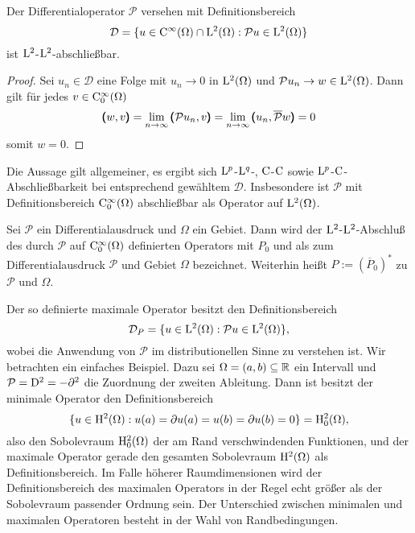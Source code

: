 \begin{lem}
Der Differentialoperator $\mathcal P$ versehen mit Definitionsbereich
\begin{equation}
  \mathcal D= \{ u\in\mathrm C^\infty(\Omega) \cap \mathrm L^2(\Omega) :  \mathcal Pu\in\mathrm L^2(\Omega) \}
\end{equation}
ist $\mathrm L^2$-$\mathrm L^2$-abschließbar.
\end{lem}
\begin{proof}
Sei $u_n\in\mathcal D$ eine Folge mit $u_n\to 0$ in $\mathrm L^2(\Omega)$ und $\mathcal Pu_n \to w\in\mathrm L^2(\Omega)$. Dann gilt f\"ur jedes 
$v\in\mathrm C^\infty_0(\Omega)$
\begin{equation}
 \pmb(w,v\pmb)=\lim_{n\to\infty}   \pmb(\mathcal Pu_n,v\pmb) = \lim_{n\to\infty} \pmb(u_n,\overline{\mathcal P}w\pmb) = 0
\end{equation}
somit $w=0$.
\end{proof}

Die Aussage gilt allgemeiner, es ergibt sich $\mathrm L^p$-$\mathrm L^q$-, $\mathrm C$-$\mathrm C$ sowie $\mathrm L^p$-$\mathrm C$-Abschließbarkeit bei entsprechend gewähltem $\mathcal D$. Insbesondere ist $\mathcal P$ mit Definitionsbereich $\mathrm C^\infty_0(\Omega)$ abschließbar als Operator auf $\mathrm L^2(\Omega)$. 

\begin{df} 
Sei $\mathcal P$ ein Differentialausdruck und $\Omega$ ein Gebiet. Dann wird der $\mathrm L^2$-$\mathrm L^2$-Abschluß des durch $\mathcal P$ auf $\mathrm C_0^\infty(\Omega)$ definierten Operators mit $P_0$ und als  zum Differentialausdruck $\mathcal P$ und Gebiet $\Omega$ bezeichnet. 
Weiterhin heißt $P := (\overline P_0)^*$  zu $\mathcal P$ und $\Omega$.
\end{df}

Der so definierte maximale Operator besitzt den Definitionsbereich
\begin{equation}
   \mathcal D_P = \{ u\in\mathrm L^2(\Omega) : \mathcal Pu \in\mathrm L^2(\Omega)\},
\end{equation}
wobei die Anwendung von $\mathcal P$ im distributionellen Sinne zu verstehen ist. Wir betrachten ein einfaches Beispiel. Dazu sei $\Omega=(a,b)\subseteq\mathbb R$ ein Intervall und $\mathcal P = \mathrm D^2 = - \partial^2$ die Zuordnung der zweiten Ableitung. Dann ist besitzt der minimale Operator den Definitionsbereich
\begin{equation}
    \{ u\in\mathrm H^2(\Omega) :  u(a)=\partial u(a)=u(b)=\partial u(b) = 0\} = \mathrm H^2_0(\Omega),
\end{equation}
also den Sobolevraum $\mathrm H^2_0(\Omega)$ der am Rand verschwindenden Funktionen, und der maximale Operator gerade den gesamten Sobolevraum $\mathrm H^2(\Omega)$ als Definitionsbereich. Im Falle h\"oherer Raumdimensionen wird der Definitionsbereich des maximalen Operators in der Regel echt größer als der Sobolevraum passender Ordnung sein.
Der Unterschied zwischen minimalen und maximalen Operatoren besteht in der Wahl von Randbedingungen. 

